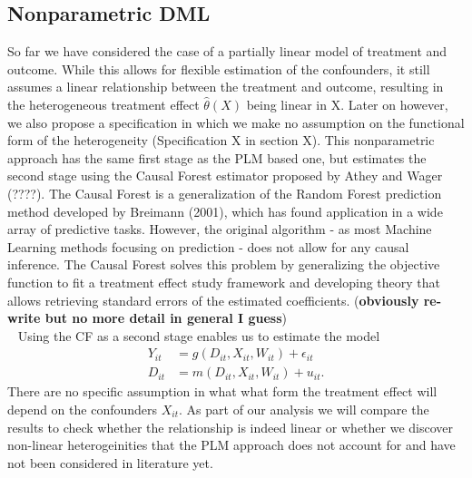 \subsection{Nonparametric DML} \label{sec:NP-DML}
So far we have considered the case of a partially linear model of treatment and outcome. While this allows for flexible estimation of the confounders, it still assumes a linear relationship between the treatment and outcome, resulting in the heterogeneous treatment effect $\hat{\theta}(X)$ being linear in X. Later on however, we also propose a specification in which we make no assumption on the functional form of the heterogeneity (Specification X in section X). This nonparametric approach has the same first stage as the PLM based one, but estimates the second stage using the Causal Forest estimator proposed by Athey and Wager (????). The Causal Forest is a generalization of the Random Forest prediction method developed by Breimann (2001), which has found application in a wide array of predictive tasks. However, the original algorithm - as most Machine Learning methods focusing on prediction - does not allow for any causal inference. The Causal Forest solves this problem by generalizing the objective function to fit a treatment effect study framework and developing theory that allows retrieving standard errors of the estimated coefficients. (\textbf{obviously re-write but no more detail in general I guess}) \\ 
Using the CF as a second stage enables us to estimate the model 
\begin{align*}
    Y_{it}&=g(D_{it}, X_{it}, W_{it})+\epsilon_{it} \\ 
    D_{it}&=m(D_{it}, X_{it}, W_{it})+u_{it}.
\end{align*}
There are no specific assumption in what what form the treatment effect will depend on the confounders $X_{it}$. As part of our analysis we will compare the results to check whether the relationship is indeed linear or whether we discover non-linear heterogeinities that the PLM approach does not account for and have not been considered in literature yet.